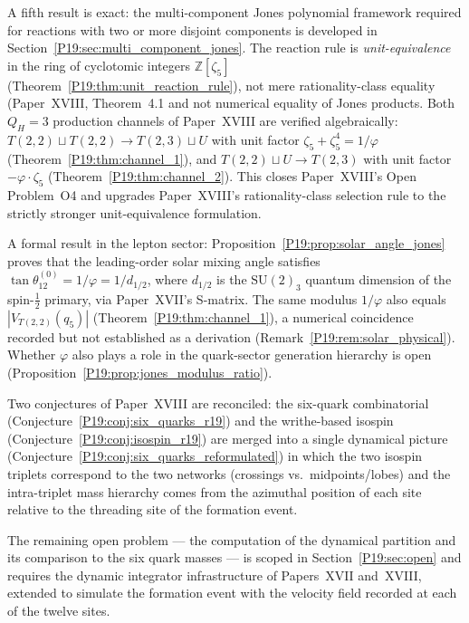 \documentclass[11pt,a4paper]{article}
\theoremstyle{definition}\newtheorem{definition}[theorem]{Definition}
\theoremstyle{remark}
\newcommand{\vp}{\varphi}
\newcommand{\QH}{Q_H}
\newcommand{\Jones}{V}
\begin{document}
A fifth result is exact: the multi-component Jones polynomial
framework required for reactions with two or more disjoint
components is developed in
Section~\ref{P19:sec:multi_component_jones}.  The reaction rule is
\emph{unit-equivalence} in the ring
of cyclotomic integers $\mathbb{Z}[\zeta_5]$
(Theorem~\ref{P19:thm:unit_reaction_rule}), not mere rationality-class
equality (Paper~XVIII, Theorem~4.1 %
and not numerical equality of Jones products.  Both $\QH=3$ production
channels of Paper~XVIII are verified algebraically:
$T(2,2)\sqcup T(2,2)\to T(2,3)\sqcup U$ with unit factor
$\zeta_5+\zeta_5^4=1/\vp$ (Theorem~\ref{P19:thm:channel_1}), and
$T(2,2)\sqcup U\to T(2,3)$ with unit factor
$-\vp\cdot\zeta_5$ (Theorem~\ref{P19:thm:channel_2}).
This closes Paper~XVIII's Open Problem~O4 and upgrades
Paper~XVIII's rationality-class selection rule to the strictly
stronger unit-equivalence formulation.

A formal result in the lepton sector:
Proposition~\ref{P19:prop:solar_angle_jones} proves that the
leading-order solar mixing angle satisfies
$\tan\theta_{12}^{(0)}=1/\vp=1/d_{1/2}$, where $d_{1/2}$ is the
$\mathrm{SU}(2)_3$ quantum dimension of the spin-$\tfrac12$ primary,
via Paper~XVII's S-matrix.  The same modulus $1/\vp$ also equals
$|\Jones_{T(2,2)}(q_5)|$ (Theorem~\ref{P19:thm:channel_1}), a
numerical coincidence recorded but not established as a derivation
(Remark~\ref{P19:rem:solar_physical}).  Whether $\vp$ also plays a
role in the quark-sector generation hierarchy is open
(Proposition~\ref{P19:prop:jones_modulus_ratio}).

Two conjectures of Paper~XVIII are reconciled: the six-quark
combinatorial (Conjecture~\ref{P19:conj:six_quarks_r19}) and the
writhe-based isospin (Conjecture~\ref{P19:conj:isospin_r19}) are
merged into a single dynamical picture
(Conjecture~\ref{P19:conj:six_quarks_reformulated}) in which the two
isospin triplets correspond to the two networks (crossings vs.\
midpoints/lobes) and the intra-triplet mass hierarchy comes from
the azimuthal position of each site relative to the threading site
of the formation event.

The remaining open problem --- the computation of the dynamical
partition and its comparison to the six quark masses --- is
scoped in Section~\ref{P19:sec:open} and requires the dynamic
integrator infrastructure of Papers~XVII and~XVIII, extended
to simulate the formation event with the velocity field recorded
at each of the twelve sites.
\end{document}
